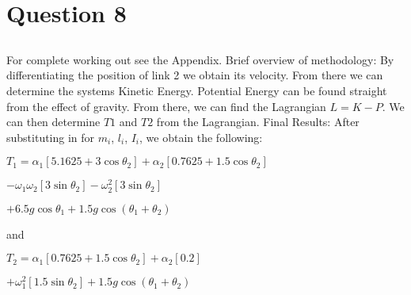 \newpage
\section{Question 8}
	\subsection{}
	For complete working out see the Appendix.
	\newline Brief overview of methodology:\newline
	By differentiating the position of link 2 we obtain its velocity. From there we can determine the systems Kinetic Energy.\newline
	Potential Energy can be found straight from the effect of gravity.\newline
	From there, we can find the Lagrangian $L = K - P$.\newline
	We can then determine $T1$ and $T2$ from the Lagrangian.\newline
	\newline
	Final Results:\newline
	After substituting in for $m_{i}$, $l_{i}$, $I_{i}$, we obtain the following:\newline \newline
	
	\hspace{20mm} $T_{1} = \alpha _{1} [5.1625 + 3\cos \theta _{2}] + \alpha _{2} [0.7625 + 1.5\cos \theta _{2}]$\newline
	
	\hspace{30mm} $ - \omega _{1} \omega _{2} [3\sin \theta _{2}] - \omega ^2 _{2}[3\sin \theta _{2}] $\newline
	
	\hspace{40mm} $ + 6.5g\cos \theta _{1} + 1.5g\cos (\theta _{1} + \theta _{2})$\newline\newline
	
	and\newline\newline
	
	\hspace{20mm} $T_{2} = \alpha _{1} [0.7625 + 1.5\cos \theta _{2}] + \alpha _{2} [0.2]$\newline
	
	\hspace{30mm} $ + \omega ^2 _{1}[1.5\sin \theta _{2}] + 1.5g\cos (\theta _{1} + \theta _{2})$\newline\newline
	
